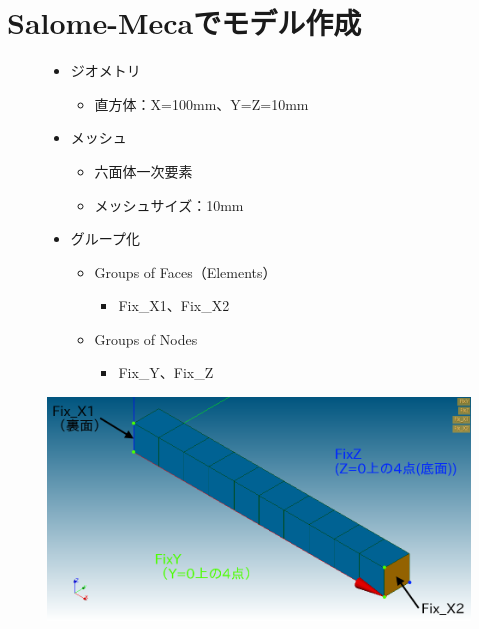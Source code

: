 \section{Salome-Mecaでモデル作成}
\vspace{-\baselineskip}
\begin{figure}[H]
	\begin{minipage}{0.49\hsize}
		\begin{itemize}
			\item ジオメトリ
			      \begin{itemize}
				      \item 直方体：X=100mm、Y=Z=10mm
			      \end{itemize}
			\item メッシュ
			      \begin{itemize}
				      \item 六面体一次要素
				      \item メッシュサイズ：10mm
			      \end{itemize}
		\end{itemize}
	\end{minipage}
	\begin{minipage}{0.49\hsize}
		\begin{itemize}
			\item グループ化
			      \begin{itemize}
				      \item Groups of Faces（Elements）
				            \begin{itemize}
					            \item Fix\_X1、Fix\_X2
				            \end{itemize}
				      \item Groups of Nodes
				            \begin{itemize}
					            \item Fix\_Y、Fix\_Z
				            \end{itemize}
			      \end{itemize}
		\end{itemize}
	\end{minipage}
\end{figure}
\vspace{-\baselineskip}
\begin{figure}[H]
	\centering
	\includegraphics[width=0.9\columnwidth]{fig/model.png}
\end{figure}
